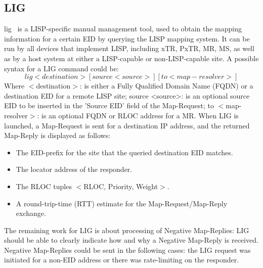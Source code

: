 
\subsection{LIG}
\label{subsec:implementation_lig}
\acrfull{lig}~\cite{rfc6835} is a LISP-specific manual management tool, used to obtain the mapping information for a certain EID by querying the LISP mapping system. It can be run by all devices that implement LISP, including xTR, PxTR, MR, MS, as well as by a host system at either a LISP-capable or non-LISP-capable site. A possible syntax for a LIG command could be:
\begin{equation}
lig <destination> [source <source>] [to <map-resolver>] \nonumber
\end{equation}
Where $<$destination$>$: is either a Fully Qualified Domain Name (FQDN) or a destination EID for a remote LISP site; source <source>: is an optional source EID to be inserted in the 'Source EID' field of the Map-Request; to $<$map-resolver$>$: is an optional FQDN or RLOC address for a MR. When LIG is launched, a Map-Request is sent for a destination IP address, and the returned Map-Reply is displayed as follows:
\begin{itemize}[noitemsep,topsep=0pt]
    \item The EID-prefix for the site that the queried destination EID matches.
    \item The locator address of the responder.
    \item The RLOC tuples $<$RLOC, Priority, Weight$>$.
    \item A round-trip-time (RTT) estimate for the Map-Request/Map-Reply exchange.
\end{itemize}

The remaining work for LIG is about processing of Negative Map-Replies: LIG should be able to clearly indicate how and why a Negative Map-Reply is received. Negative Map-Replies could be sent in the following cases: the LIG request was initiated for a non-EID address or there was rate-limiting on the responder.

